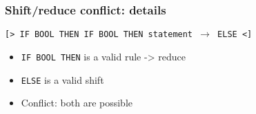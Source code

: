 \begin{frame}
  \frametitle{Shift/reduce conflict: details}
  \texttt{[> IF BOOL THEN IF BOOL THEN statement $\rightarrow$ ELSE <]}
  \begin{itemize}
    \item \texttt{IF BOOL THEN} is a valid rule -> reduce
    \item \texttt{ELSE} is a valid shift
    \item Conflict: both are possible
  \end{itemize}
\end{frame}

